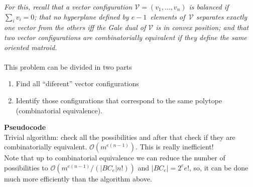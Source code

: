 \documentclass[10pt]{article}
\newcommand{\VV}{\mathcal{V}}
\begin{document}
\emph{For this, recall that a vector configuration $\VV = (v_1,\dots,v_n)$ is balanced if $\sum_i v_i=0$;
that no hyperplane defined by $e-1$~elements of~$\VV$ separates   exactly one vector from the others iff the Gale dual of $\VV$ is in   convex position; and that two vector configurations are combinatorially equivalent if they define the same oriented matroid.}
\\\\This problem can be divided in two parts
\begin{enumerate}
	\item Find all ``diferent'' vector configurations
	\item Identify those configurations that correspond to the same polytope (combinatorial equivalence).
\end{enumerate}
\textbf{Pseudocode}
\\Trivial algorithm: check all the possibilities and after that check if they are combinatorially equivalent. $\mathcal{O}(m^{e(n-1)})$. This is really inefficient!
\\Note that up to combinatorial equivalence we can reduce the number of possibilities to $\mathcal{O}(m^{e(n-1)}/(|BC_e|n!))$ and $|BC_e| = 2^e e!$, so, it can be done much more efficiently than the algorithm above.
\end{document}
